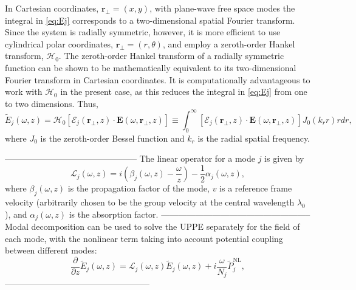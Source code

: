 \documentclass[a4paper]{jpconf}
\begin{document}
In Cartesian coordinates, $\mathbf{r}_\perp = (x,y)$, with plane-wave free space modes the integral in \eqref{eq:Ej} corresponds to a two-dimensional spatial Fourier transform. Since the system is radially symmetric, however, it is more efficient to use cylindrical polar coordinates, $\mathbf{r}_\perp = (r, \theta)$, and employ a zeroth-order Hankel transform, $\mathcal{H}_0$. The zeroth-order Hankel transform of a radially symmetric function can be shown to be mathematically equivalent to its two-dimensional Fourier transform in Cartesian coordinates. It is computationally advantageous to work with $\mathcal{H}_0$ in the present case, as this reduces the integral in \eqref{eq:Ej} from one to two dimensions. Thus,
\begin{equation}
\tilde{E}_j(\omega, z) = \mathcal{H}_0 \left[ \boldsymbol{\mathcal{E}}_j(\mathbf{r}_\perp, z) \cdot \mathbf{E}(\omega, \mathbf{r}_\perp, z) \right] \equiv \int_0^\infty  \left[ \boldsymbol{\mathcal{E}}_j(\mathbf{r}_\perp, z) \cdot \mathbf{E}(\omega, \mathbf{r}_\perp, z) \right] J_0(k_r r)r dr,
\end{equation}
where $J_0$ is the zeroth-order Bessel function and $k_r$ is the radial spatial frequency. 


-----------------------------------------------
The linear operator for a mode $j$ is given by 
\begin{equation}\label{eq:Lj}
\mathcal{L}_j(\omega,z) = i \left( \beta_j(\omega, z) - \frac{\omega}{z} \right) - \frac{1}{2} \alpha_j (\omega,z),
\end{equation}
where $\beta_j(\omega,z)$ is the propagation factor of the mode, $v$ is a reference frame velocity (arbitrarily chosen to be the group velocity at the central wavelength $\lambda_0$), and $\alpha_j(\omega,z)$ is the absorption factor.  
-----------------------------------------------------
Modal decomposition can be used to solve the UPPE separately for the field of each mode, with the nonlinear term taking into account potential coupling between different modes:
\begin{equation}
\frac{\partial}{\partial z} \tilde{E}_j(\omega,z) = \mathcal{L}_j (\omega,z) \tilde{E}_j(\omega,z)+ i\frac{\omega}{N_{j}} \tilde{P}_{j}^\text{NL},
\end{equation}
---------------------------------------------------
\end{document}
